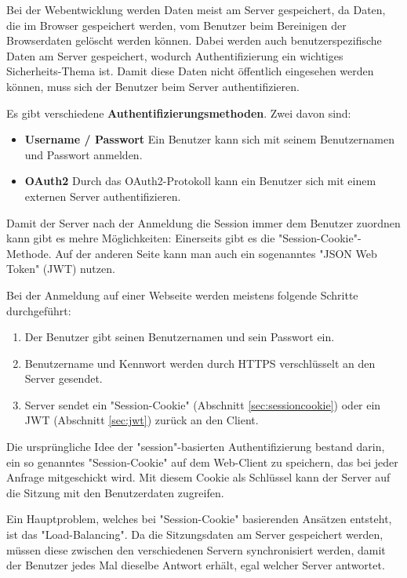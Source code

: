 

Bei der Webentwicklung werden Daten meist am Server gespeichert, da Daten, die im Browser gespeichert werden, vom Benutzer beim Bereinigen der Browserdaten gelöscht werden können. 
Dabei werden auch benutzerspezifische Daten am Server gespeichert, wodurch Authentifizierung ein wichtiges Sicherheits-Thema ist.
Damit diese Daten nicht öffentlich eingesehen werden können, muss sich der Benutzer beim Server authentifizieren.

Es gibt verschiedene \textbf{Authentifizierungsmethoden}. Zwei davon sind:
\begin{itemize} 
    \item \textbf{Username / Passwort} Ein Benutzer kann sich mit seinem Benutzernamen und Passwort anmelden.
    \item \textbf{OAuth2} Durch das OAuth2-Protokoll kann ein Benutzer sich mit einem externen Server authentifizieren. \cite{OAuth2}
\end{itemize}

Damit der Server nach der Anmeldung die Session immer dem Benutzer zuordnen kann gibt es mehre Möglichkeiten:
Einerseits gibt es die "Session-Cookie"-Methode. Auf der anderen Seite kann man auch ein sogenanntes "JSON Web Token" (JWT) nutzen.

Bei der Anmeldung auf einer Webseite werden meistens folgende Schritte durchgeführt:
\begin{enumerate}
    \item Der Benutzer gibt seinen Benutzernamen und sein Passwort ein.
    \item Benutzername und Kennwort werden durch HTTPS verschlüsselt an den Server gesendet.
    \item Server sendet ein "Session-Cookie" (Abschnitt \ref{sec:sessioncookie}) oder ein JWT (Abschnitt \ref{sec:jwt}) zurück an den Client.
\end{enumerate}

\pagebreak
{}\label{sec:sessioncookie}

Die ursprüngliche Idee der "session"-basierten Authentifizierung bestand darin, ein so genanntes "Session-Cookie" auf dem Web-Client zu speichern, das bei jeder Anfrage mitgeschickt wird. Mit diesem Cookie als Schlüssel kann der Server auf die Sitzung mit den Benutzerdaten zugreifen. 

Ein Hauptproblem, welches bei "Session-Cookie" basierenden Ansätzen entsteht, ist das "Load-Balancing". 
Da die Sitzungsdaten am Server gespeichert werden, müssen diese zwischen den verschiedenen Servern synchronisiert werden, damit der Benutzer jedes Mal dieselbe Antwort erhält, egal welcher Server antwortet. 

